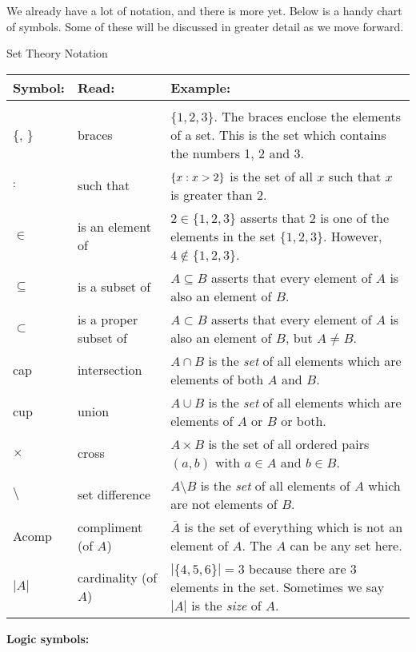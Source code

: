\documentclass[12pt]{article}
\begin{document}
We already have a lot of notation, and there is more yet.  Below is a handy chart of symbols.  Some of these will be discussed in greater detail as we move forward.





\begin{defbox}{Set Theory Notation}
\noindent  \begin{tabular}{p{.75in} p{1.35in} p{3.15in}}
    Symbol: & Read: & Example: \\ \hline \\
    $\{$, $\}$ & braces & $\{1,2,3\}$.  The braces enclose the elements of a set.  This is the set which contains the numbers 1, 2 and 3.\\[1ex]
    $:$ & such that & $\{x : x > 2\}$ is the set of all $x$ such that $x$ is greater than 2.\\[1ex]
    $\in$ & is an element of & $2 \in \{1,2,3\}$ asserts that 2 is one of the elements in the set $\{1,2,3\}$.  However, $4 \notin\{1,2,3\}$.\\[1ex]
    $\subseteq$ & is a subset of & $A \subseteq B$ asserts that every element of $A$ is also an element of $B$.\\[1ex]
    $\subset$ & is a proper subset of & $A \subset B$ asserts that every element of $A$ is also an element of $B$, but $A \ne B$.\\[1ex]
    \gls{cap} & intersection & $A \cap B$ is the \emph{set} of all elements which are elements of both $A$ and $B$.\\[1ex]
    \gls{cup} & union & $A \cup B$ is the \emph{set} of all elements which are elements of $A$ or $B$ or both.\\[1ex]
    $\times$ & cross & $A \times B$ is the set of all ordered pairs $(a,b)$ with $a \in A$ and $b \in B$. \\[1ex]
    $\setminus$ & set difference & $A \setminus B$ is the \emph{set} of all elements of $A$ which are not elements of $B$.\\[1ex]
    \gls{Acomp} & compliment (of $A$) & $\bar A$ is the set of everything which is not an element of $A$.  The $A$ can be any set here.\\[1ex]
    $|A|$ & cardinality (of $A$)& $|\{4,5,6\}| = 3$ because there are 3 elements in the set.  Sometimes we say $|A|$ is the \emph{size} of $A$.\\[1ex]
\end{tabular}
\noindent\textbf{Logic symbols:}\\
\noindent  \begin{tabular}{p{.75in} p{1.35in} p{3.15in}}


\end{tabular}
\end{defbox}
\end{document}
